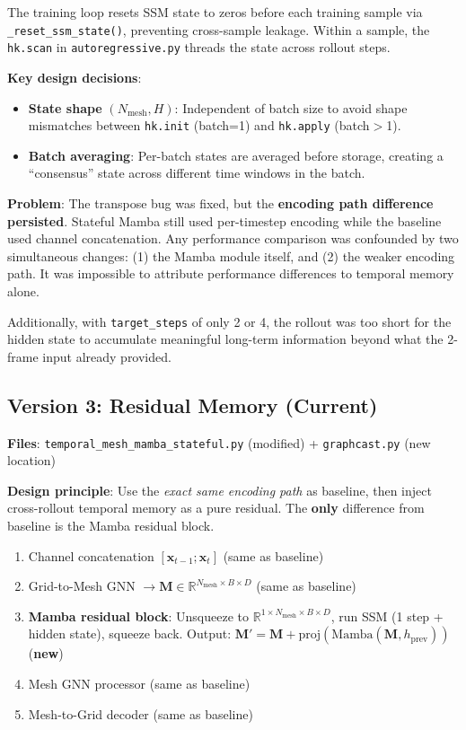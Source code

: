 \documentclass[11pt,a4paper]{article}
\begin{document}
The training loop resets SSM state to zeros before each training sample via \texttt{\_reset\_ssm\_state()}, preventing cross-sample leakage. Within a sample, the \texttt{hk.scan} in \texttt{autoregressive.py} threads the state across rollout steps.

\textbf{Key design decisions}:
\begin{itemize}[nosep]
    \item \textbf{State shape} $(N_\text{mesh}, H)$: Independent of batch size to avoid shape mismatches between \texttt{hk.init} (batch=1) and \texttt{hk.apply} (batch$>$1).
    \item \textbf{Batch averaging}: Per-batch states are averaged before storage, creating a ``consensus'' state across different time windows in the batch.
\end{itemize}

\textbf{Problem}: The transpose bug was fixed, but the \textbf{encoding path difference persisted}. Stateful Mamba still used per-timestep encoding while the baseline used channel concatenation. Any performance comparison was confounded by two simultaneous changes: (1) the Mamba module itself, and (2) the weaker encoding path. It was impossible to attribute performance differences to temporal memory alone.

Additionally, with \texttt{target\_steps} of only 2 or 4, the rollout was too short for the hidden state to accumulate meaningful long-term information beyond what the 2-frame input already provided.

\subsection{Version 3: Residual Memory (Current)}

\textbf{Files}: \texttt{temporal\_mesh\_mamba\_stateful.py} (modified) + \texttt{graphcast.py} (new location)

\textbf{Design principle}: Use the \emph{exact same encoding path} as baseline, then inject cross-rollout temporal memory as a pure residual. The \textbf{only} difference from baseline is the Mamba residual block.

\begin{enumerate}[nosep]
    \item Channel concatenation $[\mathbf{x}_{t-1}; \mathbf{x}_t]$ \hfill (same as baseline)
    \item Grid-to-Mesh GNN $\rightarrow \mathbf{M} \in \mathbb{R}^{N_\text{mesh} \times B \times D}$ \hfill (same as baseline)
    \item \textbf{Mamba residual block}: Unsqueeze to $\mathbb{R}^{1 \times N_\text{mesh} \times B \times D}$, run SSM (1 step + hidden state), squeeze back. Output: $\mathbf{M}' = \mathbf{M} + \text{proj}(\text{Mamba}(\mathbf{M}, h_\text{prev}))$ \hfill (\textbf{new})
    \item Mesh GNN processor \hfill (same as baseline)
    \item Mesh-to-Grid decoder \hfill (same as baseline)
\end{enumerate}
\end{document}

